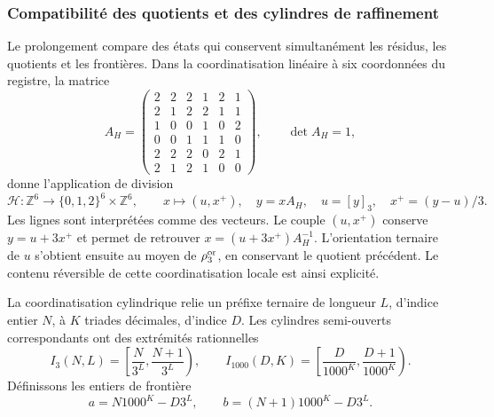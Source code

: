 \subsubsection{Compatibilité des quotients et des cylindres de raffinement}

Le prolongement compare des états qui conservent simultanément les résidus, les quotients et les frontières. Dans la coordinatisation linéaire à six coordonnées du registre, la matrice
\[
 A_H=\begin{pmatrix}
 2&2&2&1&2&1\\2&1&2&2&1&1\\1&0&0&1&0&2\\
 0&0&1&1&1&0\\2&2&2&0&2&1\\2&1&2&1&0&0
 \end{pmatrix},\qquad\det A_H=1,
\]
donne l'application de division
\begin{equation}
 \mathcal H:\mathbb Z^6\longrightarrow
 \{0,1,2\}^6\times\mathbb Z^6,\qquad
 x\longmapsto(u,x^+),\quad
 y=xA_H,\quad u=[y]_3,\quad x^+=(y-u)/3.
 \label{ii:tpk-hensel-local}
\end{equation}
Les lignes sont interprétées comme des vecteurs. Le couple \((u,x^+)\) conserve \(y=u+3x^+\) et permet de retrouver \(x=(u+3x^+)A_H^{-1}\). L'orientation ternaire de \(u\) s'obtient ensuite au moyen de \(\rho_3^{\rm or}\), en conservant le quotient précédent. Le contenu réversible de cette coordinatisation locale est ainsi explicité.

La coordinatisation cylindrique relie un préfixe ternaire de longueur \(L\), d'indice entier \(N\), à \(K\) triades décimales, d'indice \(D\). Les cylindres semi-ouverts correspondants ont des extrémités rationnelles
\[
 I_3(N,L)=\left[\frac N{3^L},\frac{N+1}{3^L}\right),\qquad
 I_{1000}(D,K)=\left[\frac D{1000^K},\frac{D+1}{1000^K}\right).
\]
Définissons les entiers de frontière
\[
 a=N1000^K-D3^L,\qquad b=(N+1)1000^K-D3^L.
\]

